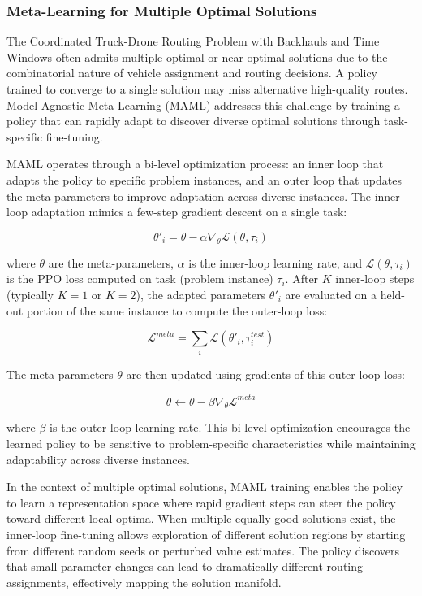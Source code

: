 \subsubsection{Meta-Learning for Multiple Optimal Solutions}

The Coordinated Truck-Drone Routing Problem with Backhauls and Time Windows often admits multiple optimal or near-optimal solutions due to the combinatorial nature of vehicle assignment and routing decisions. A policy trained to converge to a single solution may miss alternative high-quality routes. Model-Agnostic Meta-Learning (MAML) addresses this challenge by training a policy that can rapidly adapt to discover diverse optimal solutions through task-specific fine-tuning.

MAML operates through a bi-level optimization process: an inner loop that adapts the policy to specific problem instances, and an outer loop that updates the meta-parameters to improve adaptation across diverse instances. The inner-loop adaptation mimics a few-step gradient descent on a single task:

\begin{equation}
\theta'_i = \theta - \alpha \nabla_\theta \mathcal{L}(\theta, \tau_i)
\end{equation}

where $\theta$ are the meta-parameters, $\alpha$ is the inner-loop learning rate, and $\mathcal{L}(\theta, \tau_i)$ is the PPO loss computed on task (problem instance) $\tau_i$. After $K$ inner-loop steps (typically $K=1$ or $K=2$), the adapted parameters $\theta'_i$ are evaluated on a held-out portion of the same instance to compute the outer-loop loss:

\begin{equation}
\mathcal{L}^{meta} = \sum_i \mathcal{L}(\theta'_i, \tau_i^{test})
\end{equation}

The meta-parameters $\theta$ are then updated using gradients of this outer-loop loss:

\begin{equation}
\theta \leftarrow \theta - \beta \nabla_\theta \mathcal{L}^{meta}
\end{equation}

where $\beta$ is the outer-loop learning rate. This bi-level optimization encourages the learned policy to be sensitive to problem-specific characteristics while maintaining adaptability across diverse instances.

In the context of multiple optimal solutions, MAML training enables the policy to learn a representation space where rapid gradient steps can steer the policy toward different local optima. When multiple equally good solutions exist, the inner-loop fine-tuning allows exploration of different solution regions by starting from different random seeds or perturbed value estimates. The policy discovers that small parameter changes can lead to dramatically different routing assignments, effectively mapping the solution manifold.


